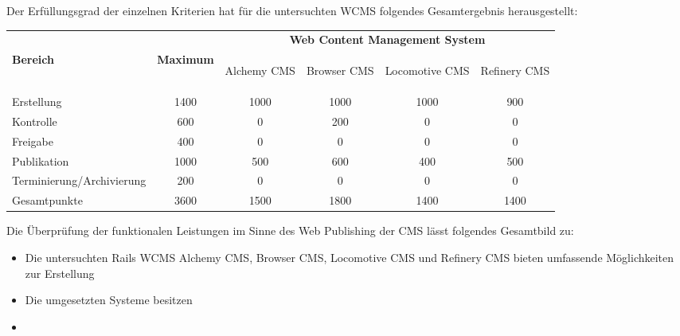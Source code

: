 Der Erfüllungsgrad der einzelnen Kriterien hat für die untersuchten WCMS folgendes Gesamtergebnis herausgestellt:

\begin{table}[!h]
\renewcommand{\arraystretch}{1.5}
\center
\begin{tabular}{|l|c|c|c|c|c|}
\hline
& & \multicolumn{4}{c|}{\textbf{Web Content Management System}} \\[2pt]
\cline{3-6}
\textbf{Bereich}& \textbf{Maximum} &
\begin{sideways}
Alchemy CMS
\end{sideways}
&\begin{sideways}
Browser CMS
\end{sideways}
&\begin{sideways}
Locomotive CMS
\end{sideways}
&\begin{sideways}
Refinery CMS
\end{sideways} \\
\hline
Erstellung & 1400 & 1000 & 1000 & 1000 & 900 \\
\hline
Kontrolle & 600 & 0 & 200 & 0 & 0 \\
\hline
Freigabe & 400 & 0 & 0 & 0 & 0 \\
\hline
Publikation & 1000 & 500 & 600 & 400 & 500 \\
\hline
Terminierung/Archivierung & 200 & 0 & 0 & 0 & 0 \\
\hline
\hline
Gesamtpunkte & 3600 & 1500 & 1800 & 1400 & 1400 \\
\hline
\end{tabular}
\end{table}


Die Überprüfung der funktionalen Leistungen im Sinne des Web Publishing der CMS lässt folgendes Gesamtbild zu:


\begin{itemize}
\item
Die untersuchten Rails WCMS Alchemy CMS, Browser CMS, Locomotive CMS und Refinery CMS bieten umfassende Möglichkeiten zur Erstellung
\item
Die umgesetzten Systeme besitzen
\item

\end{itemize}

